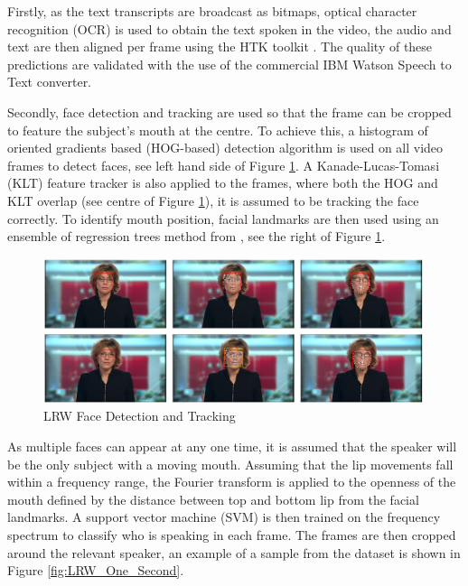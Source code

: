 \documentclass[12pt]{report}
\begin{document}
Firstly, as the text transcripts are broadcast as bitmaps, optical character recognition (OCR) \cite{Buehler2009} is used to obtain the text spoken in the video, the audio and text are then aligned per frame using the HTK toolkit \cite{Woodland1995}.
The quality of these predictions are validated with the use of the commercial IBM Watson Speech to Text converter.

Secondly, face detection and tracking are used so that the frame can be cropped to feature the subject's mouth at the centre.
To achieve this, a histogram of oriented gradients based (HOG-based) detection algorithm \cite{King2009} is used on all video frames to detect faces, see left hand side of Figure \ref{fig:LRW_Face_Detection}.
A Kanade-Lucas-Tomasi (KLT) feature tracker is also applied to the frames, where both the HOG and KLT overlap (see centre of Figure \ref{fig:LRW_Face_Detection}), it is assumed to be tracking the face correctly.
To identify mouth position, facial landmarks are then used using an ensemble of regression trees method from \cite{Kazemi2014}, see the right of Figure \ref{fig:LRW_Face_Detection}.

\begin{figure}[h]
    \centering
        \includegraphics[width=0.99\textwidth]{figures/lrw_face_detection.png}
    \caption{LRW Face Detection and Tracking \cite{Chung2016}}\label{fig:LRW_Face_Detection}
\end{figure}

As multiple faces can appear at any one time, it is assumed that the speaker will be the only subject with a moving mouth.
Assuming that the lip movements fall within a frequency range, the Fourier transform is applied to the openness of the mouth defined by the distance between top and bottom lip from the facial landmarks.
A support vector machine (SVM) is then trained on the frequency spectrum to classify who is speaking in each frame.
The frames are then cropped around the relevant speaker, an example of a sample from the dataset is shown in Figure \ref{fig:LRW_One_Second}.
\end{document}
